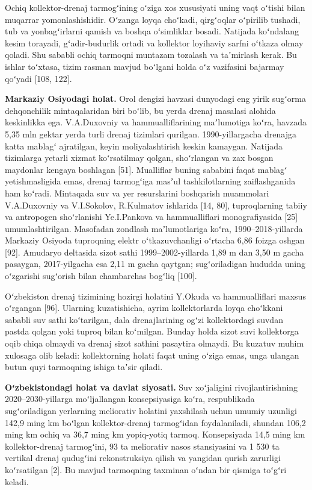 Ochiq kollektor-drenaj tarmogʻining oʻziga xos xususiyati uning vaqt
oʻtishi bilan muqarrar yomonlashishidir. Oʻzanga loyqa choʻkadi,
qirgʻoqlar oʻpirilib tushadi, tub va yonbagʻirlarni qamish va boshqa
oʻsimliklar bosadi. Natijada koʻndalang kesim torayadi, gʻadir-budurlik
ortadi va kollektor loyihaviy sarfni oʻtkaza olmay qoladi. Shu sababli
ochiq tarmoqni muntazam tozalash va taʼmirlash kerak. Bu ishlar
toʻxtasa, tizim rasman mavjud boʻlgani holda oʻz vazifasini bajarmay
qoʻyadi {[}108, 122{]}.

\textbf{Markaziy Osiyodagi holat.} Orol dengizi havzasi dunyodagi eng
yirik sugʻorma dehqonchilik mintaqalaridan biri boʻlib, bu yerda drenaj
masalasi alohida keskinlikka ega. V.A.Duxovniy va hammualliflarining
maʼlumotiga koʻra, havzada 5,35 mln gektar yerda turli drenaj tizimlari
qurilgan. 1990-yillargacha drenajga katta mablagʻ ajratilgan, keyin
moliyalashtirish keskin kamaygan. Natijada tizimlarga yetarli xizmat
koʻrsatilmay qolgan, shoʻrlangan va zax bosgan maydonlar kengaya
boshlagan {[}51{]}. Mualliflar buning sababini faqat mablagʻ
yetishmasligida emas, drenaj tarmogʻiga masʼul tashkilotlarning
zaiflashganida ham koʻradi. Mintaqada suv va yer resurslarini boshqarish
muammolari V.A.Duxovniy va V.I.Sokolov, R.Kulmatov ishlarida {[}14,
80{]}, tuproqlarning tabiiy va antropogen shoʻrlanishi Ye.I.Pankova va
hammualliflari monografiyasida {[}25{]} umumlashtirilgan. Masofadan
zondlash maʼlumotlariga koʻra, 1990--2018-yillarda Markaziy Osiyoda
tuproqning elektr oʻtkazuvchanligi oʻrtacha 6,86 foizga oshgan {[}92{]}.
Amudaryo deltasida sizot sathi 1999--2002-yillarda 1,89 m dan 3,50 m
gacha pasaygan, 2017-yilgacha esa 2,11 m gacha qaytgan; sugʻoriladigan
hududda uning oʻzgarishi sugʻorish bilan chambarchas bogʻliq {[}100{]}.

Oʻzbekiston drenaj tizimining hozirgi holatini Y.Okuda va hammualliflari
maxsus oʻrgangan {[}96{]}. Ularning kuzatishicha, ayrim kollektorlarda
loyqa choʻkkani sababli suv sathi koʻtarilgan, dala drenajlarining ogʻzi
kollektordagi suvdan pastda qolgan yoki tuproq bilan koʻmilgan. Bunday
holda sizot suvi kollektorga oqib chiqa olmaydi va drenaj sizot sathini
pasaytira olmaydi. Bu kuzatuv muhim xulosaga olib keladi: kollektorning
holati faqat uning oʻziga emas, unga ulangan butun quyi tarmoqning
ishiga taʼsir qiladi.

\textbf{Oʻzbekistondagi holat va davlat siyosati.} Suv xoʻjaligini
rivojlantirishning 2020--2030-yillarga moʻljallangan konsepsiyasiga
koʻra, respublikada sugʻoriladigan yerlarning meliorativ holatini
yaxshilash uchun umumiy uzunligi 142,9 ming km boʻlgan kollektor-drenaj
tarmogʻidan foydalaniladi, shundan 106,2 ming km ochiq va 36,7 ming km
yopiq-yotiq tarmoq. Konsepsiyada 14,5 ming km kollektor-drenaj
tarmogʻini, 93 ta meliorativ nasos stansiyasini va 1 530 ta vertikal
drenaj qudugʻini rekonstruksiya qilish va yangidan qurish zarurligi
koʻrsatilgan {[}2{]}. Bu mavjud tarmoqning taxminan oʻndan bir qismiga
toʻgʻri keladi.

